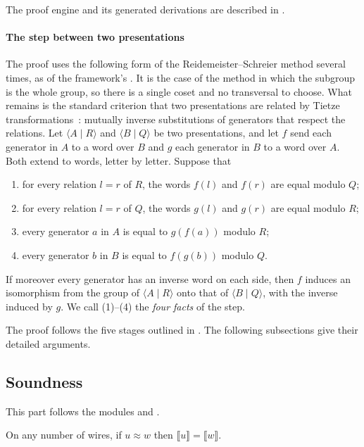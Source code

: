 \documentclass[acmsmall,screen,nonacm]{acmart}
\begin{document}
The proof engine and its generated derivations are described in .

\paragraph{The step between two presentations} The proof uses the following form of the Reidemeister--Schreier method several times, as  of the framework's . It is the case of the method in which the subgroup is the whole group, so there is a single coset and no transversal to choose. What remains is the standard criterion that two presentations are related by Tietze transformations~\cite{magnus2004combinatorial}: mutually inverse substitutions of generators that respect the relations. Let $\langle A\mid R\rangle$ and $\langle B\mid Q\rangle$ be two presentations, and let $f$ send each generator in $A$ to a word over $B$ and $g$ each generator in $B$ to a word over $A$. Both extend to words, letter by letter. Suppose that
\begin{enumerate}
\item for every relation $l=r$ of $R$, the words $f(l)$ and $f(r)$ are equal modulo $Q$;
\item for every relation $l=r$ of $Q$, the words $g(l)$ and $g(r)$ are equal modulo $R$;
\item every generator $a$ in $A$ is equal to $g(f(a))$ modulo $R$;
\item every generator $b$ in $B$ is equal to $f(g(b))$ modulo $Q$.
\end{enumerate}
If moreover every generator has an inverse word on each side, then $f$ induces an isomorphism from the group of $\langle A\mid R\rangle$ onto that of $\langle B\mid Q\rangle$, with the inverse induced by $g$. We call (1)--(4) the \emph{four facts} of the step.

The proof follows the five stages outlined in . The following subsections give their detailed arguments.

\subsection{Soundness}\label{app:xcxccx-sound}

This part follows the modules  and .

\begin{proposition}\label{prop:x-sound}
On any number of wires, if $u\approx w$ then $\llbracket u\rrbracket=\llbracket w\rrbracket$.
\end{proposition}
\end{document}
